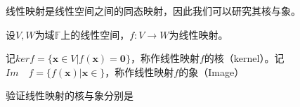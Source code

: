 
线性映射是线性空间之间的同态映射，因此我们可以研究其核与象。
\begin{definition}{}
设$V,W$为域$\mathbb F$上的线性空间，$f:V\rightarrow W$为线性映射。

记$ker f=\{\boldsymbol x\in V|f(\boldsymbol x)=\boldsymbol 0\}$，称作线性映射$f$的核（kernel）。记$Im\quad f=\{f(\boldsymbol x)|\boldsymbol x\in \}$，称作线性映射$f$的象（Image）
\end{definition}
\begin{exercise}{}
验证线性映射的核与象分别是
\end{exercise}